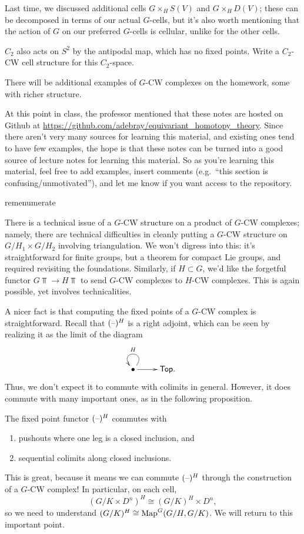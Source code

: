 Last time, we discussed additional cells $G\times_H S(V)$ and $G\times_H D(V)$; these can be decomposed in terms of
our actual $G$-cells, but it's also worth mentioning that the action of $G$ on our preferred $G$-cells is cellular,
unlike for the other cells.
\begin{ex}
$C_2$ also acts on $S^2$ by the antipodal map, which has no fixed points. Write a $C_2$-CW cell structure for this
$C_2$-space.
\end{ex}
There will be additional examples of $G$-CW complexes on the homework, some with richer structure.
\begin{rem}
At this point in class, the professor mentioned that these notes are hosted on Github at
\url{https://github.com/adebray/equivariant_homotopy_theory}. Since there aren't very many sources for learning
this material, and existing ones tend to have few examples, the hope is that these notes can be turned into a good
source of lecture notes for learning this material. So as you're learning this material, feel free to add
examples, insert comments (e.g.\ ``this section is confusing/unmotivated''), and let me know if you want access to
the repository.
\end{rem}
\begin{comp}{rem}{enumerate}
	\item There is a technical issue of a $G$-CW structure on a product of $G$-CW complexes; namely, there are
	technical difficulties in cleanly putting a $G$-CW structure on $G/H_1\times G/H_2$ involving triangulation.
	We won't digress into this: it's straightforward for finite groups, but a theorem for compact Lie groups, and
	required revisiting the foundations. Similarly, if $H\subset G$, we'd like the forgetful functor $G\Top\to
	H\Top$ to send $G$-CW complexes to $H$-CW complexes. This is again possible, yet involves technicalities.
	\item A nicer fact is that computing the fixed points of a $G$-CW complex is straightforward. Recall that
	$(\text{--})^H$ is a right adjoint, which can be seen by realizing it as the limit of the diagram
	\[\xymatrix{
		\bullet\ar@(ur, ul)_H\ar[r] & \Top.
	}\]
	Thus, we don't expect it to commute with colimits in general. However, it does commute with many important
	ones, as in the following proposition.\qedhere
\end{comp}
\begin{prop}
The fixed point functor $(\text{--})^H$ commutes with
\begin{enumerate}
	\item pushouts where one leg is a closed inclusion, and
	\item sequential colimits along closed inclusions.
\end{enumerate}
\end{prop}
This is great, because it means we can commute $(\text{--})^H$ through the construction of a $G$-CW complex! In
particular, on each cell,
\[(G/K\times D^n)^H\cong (G/K)^H\times D^n,\]
so we need to understand $(G/K)^H\cong\operatorname{Map}^G(G/H,G/K)$. We will return to this important point.
